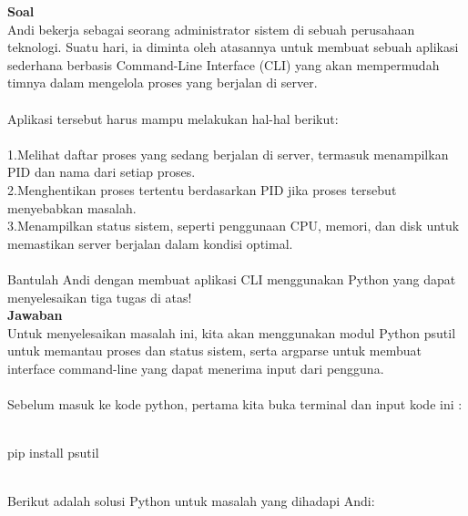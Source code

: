\documentclass[12pt]{article}
\begin{document}
\textbf{Soal}\\
Andi bekerja sebagai seorang administrator sistem di sebuah perusahaan teknologi. Suatu hari, ia diminta oleh atasannya untuk membuat sebuah aplikasi sederhana berbasis Command-Line Interface (CLI) yang akan mempermudah timnya dalam mengelola proses yang berjalan di server.\\
\\
Aplikasi tersebut harus mampu melakukan hal-hal berikut:\\
\\
1.Melihat daftar proses yang sedang berjalan di server, termasuk menampilkan PID dan nama dari setiap proses.
\\
2.Menghentikan proses tertentu berdasarkan PID jika proses tersebut menyebabkan masalah.
\\
3.Menampilkan status sistem, seperti penggunaan CPU, memori, dan disk untuk memastikan server berjalan dalam kondisi optimal.\\
\\
Bantulah Andi dengan membuat aplikasi CLI menggunakan Python yang dapat menyelesaikan tiga tugas di atas!
\\
\textbf{Jawaban}\\
Untuk menyelesaikan masalah ini, kita akan menggunakan modul Python psutil untuk memantau proses dan status sistem, serta argparse untuk membuat interface command-line yang dapat menerima input dari pengguna.\\
\\
Sebelum masuk ke kode python, pertama kita buka terminal dan input kode ini :\\
\\
\begin{text}
    pip install psutil\\
\end{text}
\\
Berikut adalah solusi Python untuk masalah yang dihadapi Andi:
\end{document}
